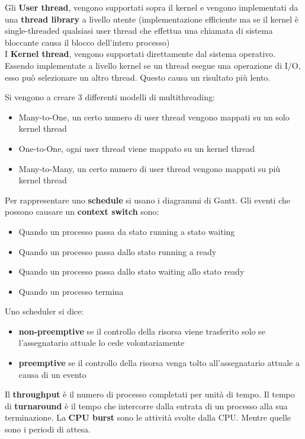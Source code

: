 \documentclass{article}
\begin{document}
Gli \textbf{User thread}, vengono supportati sopra il kernel e vengono implementati da una \textbf{thread library} a livello utente (implementazione efficiente ma se il kernel è single-threaded qualsiasi user thread che effettua una chiamata di sistema bloccante causa il blocco dell'intero processo)\\
I \textbf{Kernel thread}, vengono supportati direttamente dal sistema operativo. Essendo implementate a livello kernel se un thread esegue una operazione di I/O, esso può selezionare un altro thread. Questo causa un risultato più lento.

Si vengono a creare $3$ differenti modelli di multithreading:
\begin{itemize}
  \item Many-to-One, un certo numero di user thread vengono mappati su un solo kernel thread
  \item One-to-One, ogni user thread viene mappato su un kernel thread
  \item Many-to-Many, un certo numero di user thread vengono mappati su più kernel thread
\end{itemize}

Per rappresentare uno \textbf{schedule} si usano i diagrammi di Gantt. Gli eventi che possono causare un \textbf{context switch} sono:
\begin{itemize}
  \item Quando un processo passa da stato running a stato waiting
  \item Quando un processo passa dallo stato running a ready
  \item Quando un processo passa dallo stato waiting allo stato ready
  \item Quando un processo termina
\end{itemize}
Uno scheduler si dice:
\begin{itemize}
  \item \textbf{non-preemptive} se il controllo della risorsa viene trasferito solo se l'assegnatario attuale lo cede volontariamente
  \item \textbf{preemptive} se il controllo della risorsa venga tolto all'assegnatario attuale a causa di un evento
\end{itemize}
Il \textbf{throughput} è il numero di processo completati per unità di tempo. Il tempo di \textbf{turnaround} è il tempo che intercorre dalla entrata di un processo alla sua terminazione.
La \textbf{CPU burst} sono le attività svolte dalla CPU. Mentre quelle  sono i periodi di attesa.
\end{document}
